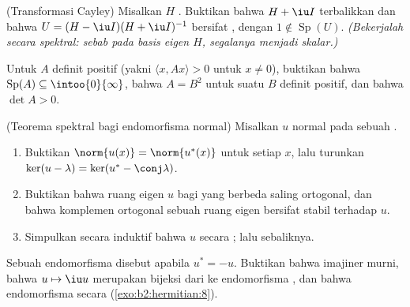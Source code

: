 \begin{exercise}[$\star\star$]\label{exo:b2:hermitian:6}
(Transformasi Cayley) Misalkan $H$ . Buktikan bahwa $H + \iu I$
terbalikkan dan bahwa $U = (H - \iu I)(H + \iu I)^{-1}$ bersifat ,
dengan $1 \notin \operatorname{Sp}(U)$. \emph{(Bekerjalah secara spektral: sebab pada
basis eigen $H$, segalanya menjadi skalar.)}
\end{exercise}

\begin{exercise}[$\star\star$]\label{exo:b2:hermitian:7}
Untuk $A$  definit positif (yakni $\langle x, Ax\rangle > 0$ untuk
$x \neq 0$), buktikan bahwa $\operatorname{Sp}(A) \subseteq
\intoo{0}{\infty}$, bahwa $A = B^2$ untuk suatu $B$  definit
positif, dan bahwa $\det A > 0$.
\end{exercise}

\begin{exercise}[$\star\star\star$]\label{exo:b2:hermitian:8}
(Teorema spektral bagi endomorfisma normal) Misalkan $u$ normal pada sebuah
.
\begin{enumerate}
  \item Buktikan $\norm{u(x)} = \norm{u^*(x)}$ untuk setiap $x$, lalu turunkan
        $\ker(u - \lambda) = \ker(u^* - \conj\lambda)$.
  \item Buktikan bahwa ruang eigen $u$ bagi  yang berbeda saling
        ortogonal, dan bahwa komplemen ortogonal sebuah
        ruang eigen bersifat stabil terhadap $u$.
  \item Simpulkan secara induktif bahwa $u$  secara ;
        lalu sebaliknya.
\end{enumerate}
\end{exercise}

\begin{exercise}[$\star$]\label{exo:b2:hermitian:9}
Sebuah endomorfisma disebut \emph{} apabila $u^* = -u$. Buktikan
bahwa  imajiner murni, bahwa $u \mapsto \iu
u$ merupakan bijeksi dari  ke endomorfisma
, dan bahwa endomorfisma   secara  (\cref{exo:b2:hermitian:8}).
\end{exercise}

